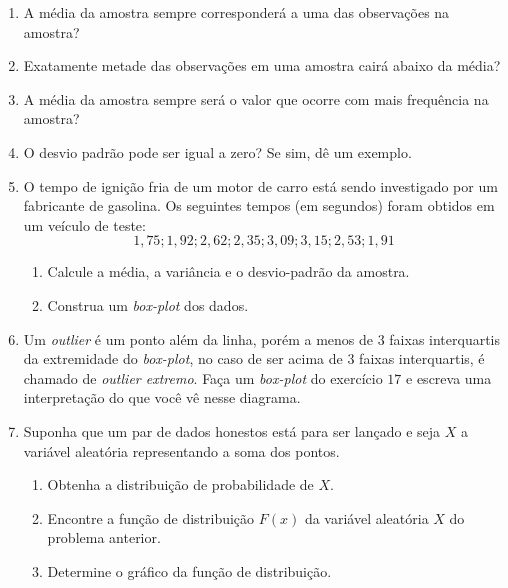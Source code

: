 \documentclass[oneside,a4paper,12pt]{article}
\begin{document}
\begin{enumerate}
	\item A média da amostra sempre corresponderá a uma das observações na amostra?
	
	\item Exatamente metade das observações em uma amostra cairá abaixo da média?
	
	\item A média da amostra sempre será o valor que ocorre com mais frequência na amostra?
	
	\item O desvio padrão pode ser igual a zero? Se sim, dê um exemplo.
	
	\item O tempo de ignição fria de um motor de carro está sendo investigado por um fabricante de gasolina. Os seguintes tempos (em segundos) foram obtidos em um veículo de teste: $$1,75;1,92;2,62;2,35;3,09;3,15;2,53;1,91$$
	\begin{enumerate}
		\item Calcule a média, a variância e o desvio-padrão da amostra.
		\item Construa um \emph{box-plot} dos dados.
	\end{enumerate}

	\item Um \emph{outlier} é um ponto além da linha, porém a menos de $3$ faixas interquartis da extremidade do \emph{box-plot}, no caso de ser acima de $3$ faixas interquartis, é chamado de \emph{outlier extremo}. Faça um \emph{box-plot} do exercício $17$ e escreva uma interpretação do que você vê nesse diagrama.
	
	\item Suponha que um par de dados honestos está para ser lançado e seja $X$ a variável aleatória representando a soma dos pontos.
	\begin{enumerate}
		\item Obtenha a distribuição de probabilidade de $X$.
		\item Encontre a função de distribuição $F(x)$ da variável aleatória $X$ do problema anterior.
		\item Determine o gráfico da função de distribuição.
	\end{enumerate}
	 

\end{enumerate}


	
\end{document}
